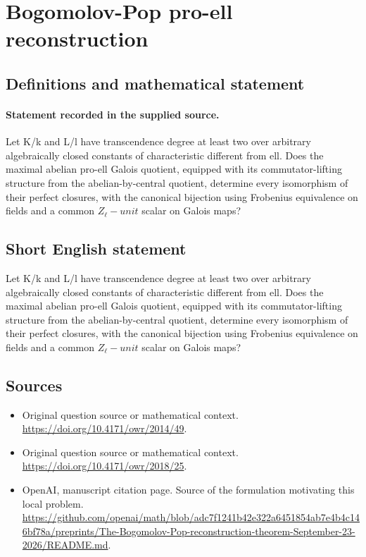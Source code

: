 \documentclass[11pt]{article}
\begin{document}
\section*{Bogomolov-Pop pro-ell reconstruction}\label{statement}
\subsection{Definitions and mathematical statement}
\paragraph{Statement recorded in the supplied source.}
Let K/k and L/l have transcendence degree at least two over arbitrary algebraically closed constants of characteristic different from ell. Does the maximal abelian pro-ell Galois quotient, equipped with its commutator-lifting structure from the abelian-by-central quotient, determine every isomorphism of their perfect closures, with the canonical bijection using Frobenius equivalence on fields and a common $Z_\ell -unit$ scalar on Galois maps?
\subsection{Short English statement}
Let K/k and L/l have transcendence degree at least two over arbitrary algebraically closed constants of characteristic different from ell. Does the maximal abelian pro-ell Galois quotient, equipped with its commutator-lifting structure from the abelian-by-central quotient, determine every isomorphism of their perfect closures, with the canonical bijection using Frobenius equivalence on fields and a common $Z_\ell -unit$ scalar on Galois maps?
\subsection{Sources}
\begin{itemize}
\item[S1] Original question source or mathematical context.
\url{https://doi.org/10.4171/owr/2014/49}.
\item[S2] Original question source or mathematical context.
\url{https://doi.org/10.4171/owr/2018/25}.
\item[S3] OpenAI, manuscript citation page. Source of the formulation motivating this local problem.
\url{https://github.com/openai/math/blob/adc7f1241b42e322a6451854ab7e4b4c146bf78a/preprints/The-Bogomolov-Pop-reconstruction-theorem-September-23-2026/README.md}.
\end{itemize}
\end{document}
